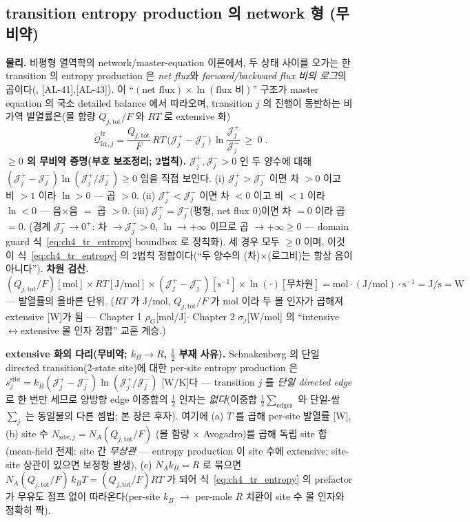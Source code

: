 \documentclass[11pt,a4paper]{article}
\newcommand{\tot}{\mathrm{tot}}
\newcommand{\irr}{\mathrm{irr}}
\newcommand{\tr}{\mathrm{tr}}
\newcommand{\AL}[1]{\textsf{[AL-#1]}}
\begin{document}
\subsection{transition entropy production 의 network 형 (무비약)}\label{sec:ch4_trep}
\textbf{물리.} 비평형 열역학의 network/master-equation 이론에서, 두 상태 사이를 오가는 한 transition 의 entropy
production 은 \emph{net flux}와 \emph{forward/backward flux 비의 로그}의 곱이다(\cite{schnakenberg1976,prigogine1967},
\AL{41},\AL{43}). 이 ``$(\text{net flux})\times\ln(\text{flux 비})$'' 구조가 master equation 의 국소 detailed
balance 에서 따라오며, transition $j$ 의 진행이 동반하는 비가역 발열률은(몰 함량 $Q_{j,\tot}/F$ 와 $RT$ 로
extensive 화)
\begin{equation}
\boxed{\;\dot{\mathcal Q}_{\irr,j}^{\tr}=\frac{Q_{j,\tot}}{F}\,RT\,\big(\mathcal J_j^+-\mathcal J_j^-\big)\,
\ln\!\frac{\mathcal J_j^+}{\mathcal J_j^-}\ \ge\ 0\;.}
\label{eq:ch4_tr_entropy}
\end{equation}
\textbf{$\ge0$ 의 무비약 증명(부호 보조정리; 2법칙).} $\mathcal J_j^+,\mathcal J_j^->0$ 인 두 양수에 대해
$(\mathcal J_j^+-\mathcal J_j^-)\ln(\mathcal J_j^+/\mathcal J_j^-)\ge0$ 임을 직접 보인다. (i) $\mathcal J_j^+>\mathcal J_j^-$
이면 차 $>0$ 이고 비 $>1$ 이라 $\ln>0$ — 곱 $>0$. (ii) $\mathcal J_j^+<\mathcal J_j^-$ 이면 차 $<0$ 이고 비
$<1$ 이라 $\ln<0$ — 음$\times$음 $=$ 곱 $>0$. (iii) $\mathcal J_j^+=\mathcal J_j^-$(평형, net flux $0$)이면
차 $=0$ 이라 곱 $=0$. (경계 $\mathcal J_j^-\!\to0^+$: 차 $\to\mathcal J_j^+>0$, $\ln\to+\infty$ 이므로 곱
$\to+\infty\ge0$ — domain guard 식~\eqref{eq:ch4_tr_entropy} boundbox 로 정칙화). 세 경우 모두 $\ge0$ 이며, 이것이 식~\eqref{eq:ch4_tr_entropy} 의 2법칙 정합이다(``두
양수의 (차)$\times$(로그비)는 항상 음이 아니다''). \textbf{차원 검산.} $(Q_{j,\tot}/F)[\mathrm{mol}]\times
RT[\mathrm{J/mol}]\times(\mathcal J_j^+-\mathcal J_j^-)[\mathrm{s^{-1}}]\times\ln(\cdot)[\text{무차원}]
=\mathrm{mol\cdot(J/mol)\cdot s^{-1}}=\mathrm{J/s}=\mathrm W$ — 발열률의 올바른 단위. ($RT$ 가 $\mathrm{J/mol}$,
$Q_{j,\tot}/F$ 가 $\mathrm{mol}$ 이라 두 몰 인자가 곱해져 extensive [W]가 됨 — Chapter 1 $\rho_G$[mol/J]$\cdot$
Chapter 2 $\sigma_j$[W/mol] 의 ``intensive$\leftrightarrow$extensive 몰 인자 정합'' 교훈 계승.)

\textbf{extensive 화의 다리(무비약; $k_B\!\to\!R$, $\tfrac12$ 부재 사유).} Schnakenberg 의 단일 directed
transition(2-state site)에 대한 per-site entropy production 은 $\dot s_j^{\mathrm{site}}=k_B(\mathcal J_j^+-\mathcal J_j^-)
\ln(\mathcal J_j^+/\mathcal J_j^-)$ [W/K]다 — transition $j$ 를 \emph{단일 directed edge} 로 한 번만 세므로 양방향
edge 이중합의 $\tfrac12$ 인자는 \emph{없다}(이중합 $\tfrac12\sum_{\text{edges}}$ 와 단일-쌍 $\sum_j$ 는 동일물의
다른 셈법; 본 장은 후자). 여기에 (a) $T$ 를 곱해 per-site 발열률 [W], (b) site 수 $N_{\mathrm{site},j}=N_A(Q_{j,\tot}/F)$
(몰 함량 $\times$ Avogadro)를 곱해 독립 site 합(mean-field 전제: site 간 \emph{무상관} — entropy production 이
site 수에 extensive; site-site 상관이 있으면 보정항 발생), (c) $N_A k_B=R$ 로 묶으면 $N_A(Q_{j,\tot}/F)\,k_B T=(Q_{j,\tot}/F)RT$
가 되어 식~\eqref{eq:ch4_tr_entropy} 의 prefactor 가 무유도 점프 없이 따라온다(per-site $k_B$ $\to$ per-mole $R$
치환이 site 수 몰 인자와 정확히 짝).
\end{document}
